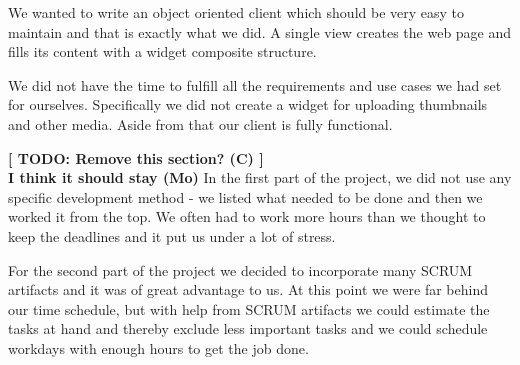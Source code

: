 We wanted to write an object oriented client which should be very easy to maintain and that is exactly what we did. A single view creates the web page and fills its content with a widget composite structure.

We did not have the time to fulfill all the requirements and use cases we had set for ourselves. Specifically we did not create a widget for uploading thumbnails and other media. Aside from that our client is fully functional.

\textbf{[ TODO: Remove this section? (C) ] \\
I think it should stay (Mo)}
In the first part of the project, we did not use any specific development method - we listed what needed to be done and then we worked it from the top. We often had to work more hours than we thought to keep the deadlines and it put us under a lot of stress.

For the second part of the project we decided to incorporate many SCRUM artifacts and it was of great advantage to us. At this point we were far behind our time schedule, but with help from SCRUM artifacts we could estimate the tasks at hand and thereby exclude less important tasks and we could schedule workdays with enough hours to get the job done.
\newpage